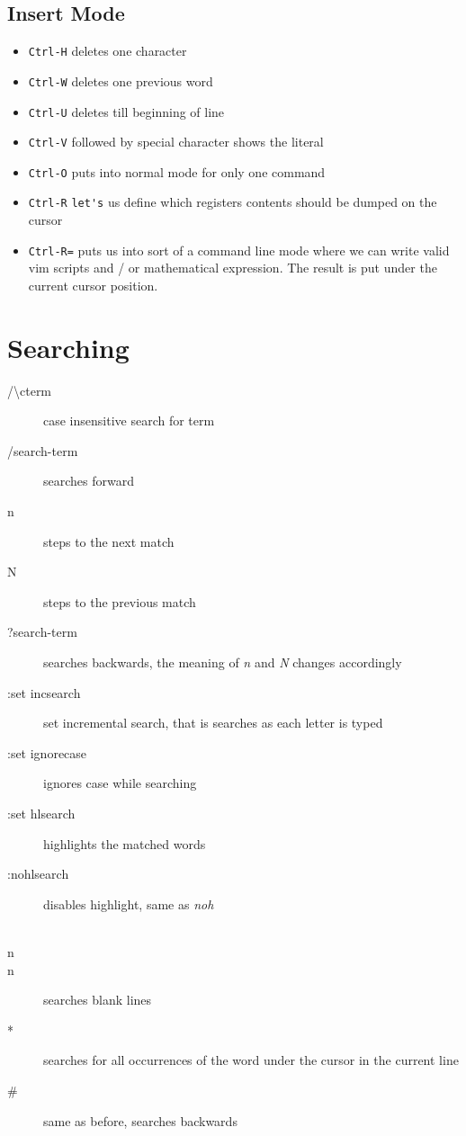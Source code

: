 \documentclass[a4paper, 12pt]{article}
\begin{document}
\subsection{Insert Mode}
\begin{itemize}
	\item \verb|Ctrl-H| deletes one character
	\item \verb|Ctrl-W| deletes one previous word
	\item \verb|Ctrl-U| deletes till beginning of line
	\item \verb|Ctrl-V| followed by special character shows the literal
	\item \verb|Ctrl-O| puts into normal mode for only one command 
	\item \verb|Ctrl-R| \verb|let's| us define which registers contents should be dumped on the cursor 
	\item \verb|Ctrl-R=| puts us into sort of a command line mode where we can write valid vim scripts and / or mathematical expression. The result is put under the current cursor position.
\end{itemize}

\section{Searching}
\begin{description}
	\item[/\textbackslash cterm] case insensitive search for term
	\item[/search-term] searches forward
	\item[n] steps to the next match
	\item[N] steps to the previous match
	\item[?search-term] searches backwards, the meaning of \emph{n} and \emph{N} changes accordingly
	\item[:set incsearch] set incremental search, that is searches as each letter is typed
	\item[:set ignorecase] ignores case while searching
	\item[:set hlsearch] highlights the matched words
	\item[:nohlsearch] disables highlight, same as \emph{noh}
	\item[\\n\\n] searches blank lines
	\item[*] searches for all occurrences of the word under the cursor in the current line
	\item[\#] same as before, searches backwards
\end{description}
\end{document}
